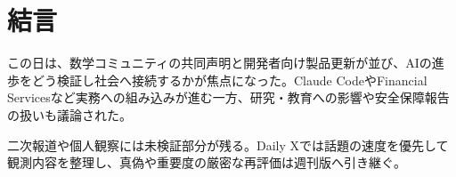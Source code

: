 \section{結言}
この日は、数学コミュニティの共同声明と開発者向け製品更新が並び、AIの進歩をどう検証し社会へ接続するかが焦点になった。Claude CodeやFinancial Servicesなど実務への組み込みが進む一方、研究・教育への影響や安全保障報告の扱いも議論された。

二次報道や個人観察には未検証部分が残る。Daily Xでは話題の速度を優先して観測内容を整理し、真偽や重要度の厳密な再評価は週刊版へ引き継ぐ。
